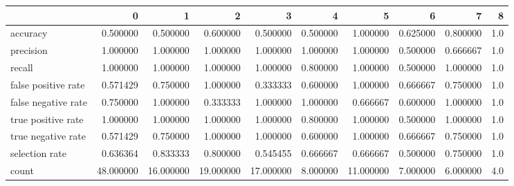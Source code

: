 \begin{tabular}{lrrrrrrrrr}
\toprule
{} &          0 &          1 &          2 &          3 &         4 &          5 &         6 &         7 &    8 \\
\midrule
accuracy            &   0.500000 &   0.500000 &   0.600000 &   0.500000 &  0.500000 &   1.000000 &  0.625000 &  0.800000 &  1.0 \\
precision           &   1.000000 &   1.000000 &   1.000000 &   1.000000 &  1.000000 &   1.000000 &  0.500000 &  0.666667 &  1.0 \\
recall              &   1.000000 &   1.000000 &   1.000000 &   1.000000 &  0.800000 &   1.000000 &  0.500000 &  1.000000 &  1.0 \\
false positive rate &   0.571429 &   0.750000 &   1.000000 &   0.333333 &  0.600000 &   1.000000 &  0.666667 &  0.750000 &  1.0 \\
false negative rate &   0.750000 &   1.000000 &   0.333333 &   1.000000 &  1.000000 &   0.666667 &  0.600000 &  1.000000 &  1.0 \\
true positive rate  &   1.000000 &   1.000000 &   1.000000 &   1.000000 &  0.800000 &   1.000000 &  0.500000 &  1.000000 &  1.0 \\
true negative rate  &   0.571429 &   0.750000 &   1.000000 &   1.000000 &  0.600000 &   1.000000 &  0.666667 &  0.750000 &  1.0 \\
selection rate      &   0.636364 &   0.833333 &   0.800000 &   0.545455 &  0.666667 &   0.666667 &  0.500000 &  0.750000 &  1.0 \\
count               &  48.000000 &  16.000000 &  19.000000 &  17.000000 &  8.000000 &  11.000000 &  7.000000 &  6.000000 &  4.0 \\
\bottomrule
\end{tabular}
